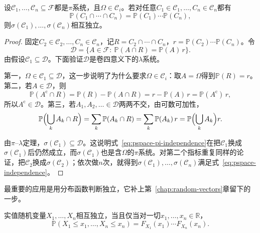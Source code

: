 \begin{lemma}
\label{lem:pspace-pi-independence}
设$\mathcal{C}_1,\dots,\mathcal{C}_n\subseteq\mathcal{F}$都是$\pi$系统，且$\Omega\in\mathcal{C}_i$。若对任意$C_1\in\mathcal{C}_1,\dots,C_n\in\mathcal{C}_n$都有
\begin{equation}
  \mathbb{P}(C_1\cap\cdots\cap C_n)=\mathbb{P}(C_1)\cdots\mathbb{P}(C_n),
  \label{eq:pspace-pi-independence}
\end{equation}
则$\sigma(\mathcal{C}_1),\dots,\sigma(\mathcal{C}_n)$相互独立。
\end{lemma}

\begin{proof}
固定$C_2\in\mathcal{C}_2,\dots,C_n\in\mathcal{C}_n$，记$R=C_2\cap\cdots\cap C_n$，$r=\mathbb{P}(C_2)\cdots\mathbb{P}(C_n)$。令
\[
  \mathcal{D}=\bigl\{A\in\mathcal{F}:\ \mathbb{P}(A\cap R)=\mathbb{P}(A)\,r\bigr\}.
\]
由假设$\mathcal{C}_1\subseteq\mathcal{D}$。下面验证$\mathcal{D}$是卷四意义下的$\lambda$系统。

第一，$\Omega\in\mathcal{C}_1\subseteq\mathcal{D}$，这一步说明了为什么要求$\Omega\in\mathcal{C}_i$：取$A=\Omega$得到$\mathbb{P}(R)=r$。第二，若$A\in\mathcal{D}$，则
\[
  \mathbb{P}(A^{\mathrm{c}}\cap R)=\mathbb{P}(R)-\mathbb{P}(A\cap R)=r-\mathbb{P}(A)\,r=\mathbb{P}(A^{\mathrm{c}})\,r,
\]
所以$A^{\mathrm{c}}\in\mathcal{D}$。第三，若$A_1,A_2,\dots\in\mathcal{D}$两两不交，由可数可加性，
\[
  \mathbb{P}\Bigl(\bigcup_kA_k\cap R\Bigr)=\sum_k\mathbb{P}(A_k\cap R)=\sum_k\mathbb{P}(A_k)\,r=\mathbb{P}\Bigl(\bigcup_kA_k\Bigr)r .
\]

由$\pi$--$\lambda$定理，$\sigma(\mathcal{C}_1)\subseteq\mathcal{D}$。这说明式~\eqref{eq:pspace-pi-independence}在把$\mathcal{C}_1$换成$\sigma(\mathcal{C}_1)$后仍然成立，而$\sigma(\mathcal{C}_1)$也是含$\Omega$的$\pi$系统。对第二个指标重复同样的论证，把$\mathcal{C}_2$换成$\sigma(\mathcal{C}_2)$；依次做$n$次，就得到$\sigma(\mathcal{C}_1),\dots,\sigma(\mathcal{C}_n)$满足式~\eqref{eq:pspace-independence}。
\end{proof}

最重要的应用是用分布函数判断独立，它补上第~\ref{chap:random-vectors}章留下的一步。

\begin{theorem}[独立的分布函数判据]
\label{thm:pspace-cdf-independence}
实值随机变量$X_1,\dots,X_n$相互独立，当且仅当对一切$x_1,\dots,x_n\in\mathbb{R}$，
\begin{equation}
  \mathbb{P}(X_1\leq x_1,\dots,X_n\leq x_n)=F_{X_1}(x_1)\cdots F_{X_n}(x_n).
  \label{eq:pspace-cdf-independence}
\end{equation}
\end{theorem}

